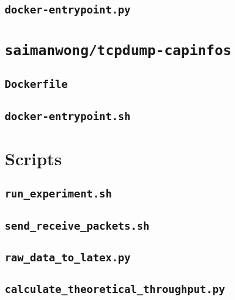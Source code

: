 \subsection{\texttt{docker-entrypoint.py}}


\clearpage
\section{\texttt{saimanwong/tcpdump-capinfos}}\label{code:tcpdump-capinfos}
\subsection{\texttt{Dockerfile}}

\subsection{\texttt{docker-entrypoint.sh}}


\clearpage
\section{Scripts}\label{code:scripts}
\subsection{\texttt{run\_experiment.sh}}

\subsection{\texttt{send\_receive\_packets.sh}}

\subsection{\texttt{raw\_data\_to\_latex.py}}

\subsection{\texttt{calculate\_theoretical\_throughput.py}}

